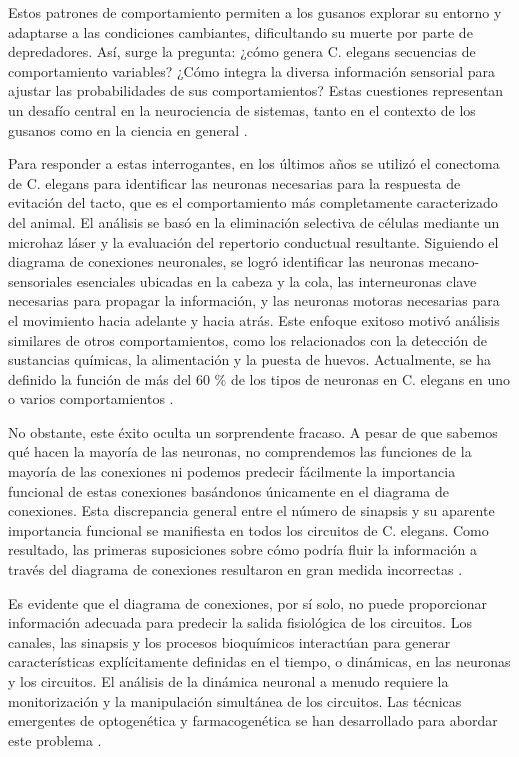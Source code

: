 Estos patrones de comportamiento permiten a los gusanos explorar su entorno y adaptarse a las condiciones cambiantes, dificultando su muerte por parte de depredadores. Así, surge la pregunta: ¿cómo genera C. elegans secuencias de comportamiento variables? ¿Cómo integra la diversa información sensorial para ajustar las probabilidades de sus comportamientos? Estas cuestiones representan un desafío central en la neurociencia de sistemas, tanto en el contexto de los gusanos como en la ciencia en general \cite{branson_imaging_2015}.

Para responder a estas interrogantes, en los últimos años  se utilizó el conectoma de C. elegans para identificar las neuronas necesarias para la respuesta de evitación del tacto, que es el comportamiento más completamente caracterizado del animal. El análisis se basó en la eliminación selectiva de células mediante un microhaz láser y la evaluación del repertorio conductual resultante. Siguiendo el diagrama de conexiones neuronales, se logró identificar las neuronas mecano-sensoriales esenciales ubicadas en la cabeza y la cola, las interneuronas clave necesarias para propagar la información, y las neuronas motoras necesarias para el movimiento hacia adelante y hacia atrás. Este enfoque exitoso motivó análisis similares de otros comportamientos, como los relacionados con la detección de sustancias químicas, la alimentación y la puesta de huevos. Actualmente, se ha definido la función de más del 60 \% de los tipos de neuronas en C. elegans en uno o varios comportamientos \cite{bargmann_connectome_2013}.


No obstante, este éxito oculta un sorprendente fracaso. A pesar de que sabemos qué hacen la mayoría de las neuronas, no comprendemos las funciones de la mayoría de las conexiones ni podemos predecir fácilmente la importancia funcional de estas conexiones basándonos únicamente en el diagrama de conexiones. Esta discrepancia general entre el número de sinapsis y su aparente importancia funcional se manifiesta en todos los circuitos de C. elegans. Como resultado, las primeras suposiciones sobre cómo podría fluir la información a través del diagrama de conexiones resultaron en gran medida incorrectas \cite{bargmann_connectome_2013}.


Es evidente que el diagrama de conexiones, por sí solo, no puede proporcionar información adecuada para predecir la salida fisiológica de los circuitos. Los canales, las sinapsis y los procesos bioquímicos interactúan para generar características explícitamente definidas en el tiempo, o dinámicas, en las neuronas y los circuitos. El análisis de la dinámica neuronal a menudo requiere la monitorización y la manipulación simultánea de los circuitos. Las técnicas emergentes de optogenética y farmacogenética se han desarrollado para abordar este problema \cite{kato_global_2015}.


